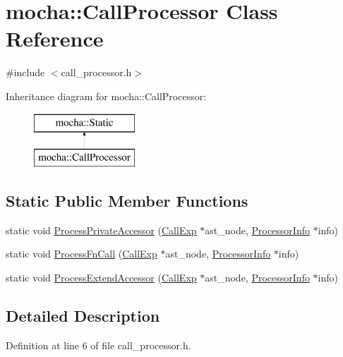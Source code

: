 \hypertarget{classmocha_1_1_call_processor}{
\section{mocha::CallProcessor Class Reference}
\label{classmocha_1_1_call_processor}
}


{\ttfamily \#include $<$call\_\-processor.h$>$}

Inheritance diagram for mocha::CallProcessor:\begin{figure}[H]
\begin{center}
\leavevmode
\includegraphics[height=2.000000cm]{classmocha_1_1_call_processor}
\end{center}
\end{figure}
\subsection*{Static Public Member Functions}
\begin{DoxyCompactItemize}
\item 
static void \hyperlink{classmocha_1_1_call_processor_a4b01fa21f9e5e67f94d976bfb84668e0}{ProcessPrivateAccessor} (\hyperlink{classmocha_1_1_call_exp}{CallExp} $\ast$ast\_\-node, \hyperlink{classmocha_1_1_processor_info}{ProcessorInfo} $\ast$info)
\item 
static void \hyperlink{classmocha_1_1_call_processor_ade6039c35412758924d37dcdda57de28}{ProcessFnCall} (\hyperlink{classmocha_1_1_call_exp}{CallExp} $\ast$ast\_\-node, \hyperlink{classmocha_1_1_processor_info}{ProcessorInfo} $\ast$info)
\item 
static void \hyperlink{classmocha_1_1_call_processor_ae91cf9d8e7ce89304a950a375ebeda9a}{ProcessExtendAccessor} (\hyperlink{classmocha_1_1_call_exp}{CallExp} $\ast$ast\_\-node, \hyperlink{classmocha_1_1_processor_info}{ProcessorInfo} $\ast$info)
\end{DoxyCompactItemize}


\subsection{Detailed Description}


Definition at line 6 of file call\_\-processor.h.



